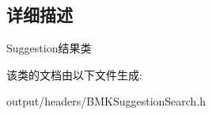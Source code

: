 \subsection{详细描述}
Suggestion结果类 

该类的文档由以下文件生成\+:\begin{DoxyCompactItemize}
\item 
output/headers/B\+M\+K\+Suggestion\+Search.\+h\end{DoxyCompactItemize}
